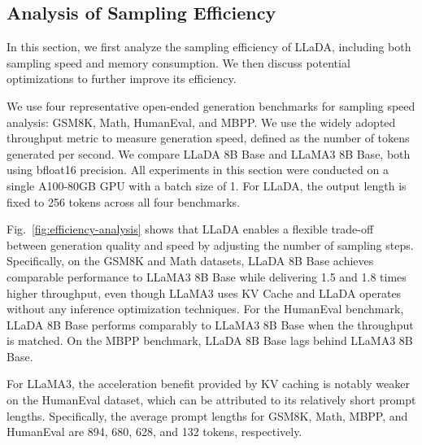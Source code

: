 \documentclass{article}
\begin{document}
\subsection{Analysis of Sampling Efficiency}
\label{app:analysis}

In this section, we first analyze the sampling efficiency of LLaDA, including both sampling speed and memory consumption. We then discuss potential optimizations to further improve its efficiency.

We use four representative open-ended generation benchmarks for sampling speed analysis: GSM8K, Math, HumanEval, and MBPP. We use the widely adopted throughput metric to measure generation speed, defined as the number of tokens generated per second. We compare LLaDA 8B Base and LLaMA3 8B Base, both using bfloat16 precision. All experiments in this section were conducted on a single A100-80GB GPU with a batch size of 1. For LLaDA, the output length is fixed to 256 tokens across all four benchmarks.

Fig.~\ref{fig:efficiency-analysis} shows that LLaDA enables a flexible trade-off between generation quality and speed by adjusting the number of sampling steps. Specifically, on the GSM8K and Math datasets, LLaDA 8B Base achieves comparable performance to LLaMA3 8B Base while delivering 1.5 and 1.8 times higher throughput, even though LLaMA3 uses KV Cache and LLaDA operates without any inference optimization techniques.  
For the HumanEval benchmark, LLaDA 8B Base performs comparably to LLaMA3 8B Base when the throughput is matched. On the MBPP benchmark, LLaDA 8B Base lags behind LLaMA3 8B Base.

For LLaMA3, the acceleration benefit provided by KV caching is notably weaker on the HumanEval dataset, which can be attributed to its relatively short prompt lengths. Specifically, the average prompt lengths for GSM8K, Math, MBPP, and HumanEval are 894, 680, 628, and 132 tokens, respectively.
\end{document}
